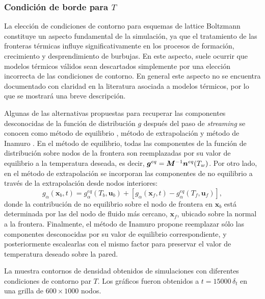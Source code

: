 \subsubsection{Condici\'on de borde para $T$}

La elecci\'on de condiciones de contorno para esquemas de lattice Boltzmann constituye un aspecto fundamental de la simulaci\'on, ya que el tratamiento de las fronteras t\'ermicas influye significativamente en los procesos de formaci\'on, crecimiento y desprendimiento de burbujas. En este aspecto, suele ocurrir que modelos t\'ermicos v\'alidos sean descartados simplemente por una elecci\'on incorrecta de las condiciones de contorno. En general este aspecto no se encuentra documentado con claridad en la literatura asociada a modelos t\'ermicos, por lo que se mostrar\'a una breve descripci\'on.

Algunas de las alternativas propuestas para recuperar las componentes desconocidas de la funci\'on de distribuci\'on $g$ despu\'es del paso de \emph{streaming} se conocen como m\'etodo de equilibrio \cite{kruger_lattice_2017}, m\'etodo de extrapolaci\'on \cite{guo_extrapolation_2002} y m\'etodo de Inamuro \cite{inamuro_lattice_2002}. En el m\'etodo de equilibrio, todas las componentes de la funci\'on de distribuci\'on sobre nodos de la frontera son reemplazadas por su valor de equilibrio a la temperatura deseada, es decir, $\bm{g}^{eq} = \bm{M}^{-1}\bm{n}^{eq}(T_w)$.  Por otro lado, en el m\'etodo de extrapolaci\'on se incorporan las componentes de no equilibrio a trav\'es de la extrapolaci\'on desde nodos interiores:
\begin{equation}
	g_{\alpha}(\bm{x}_b,t) = g_{\alpha}^{eq}(T_b, \bm{u}_b) + \left[ g_{\alpha}(\bm{x}_f,t) - g_{\alpha}^{eq}(T_f, \bm{u}_f)\right],
\end{equation}
donde la contribuci\'on de no equilibrio sobre el nodo de frontera en $\bm{x}_b$ est\'a determinada por las del nodo de fluido m\'as cercano, $\bm{x}_f$, ubicado sobre la normal a la frontera. Finalmente, el m\'etodo de Inamuro propone reemplazar s\'olo las componentes desconocidas por su valor de equilibrio correspondiente, y posteriormente escalearlas con el mismo factor para preservar el valor de temperatura deseado sobre la pared.

La  muestra contornos de densidad obtenidos de simulaciones con diferentes condiciones de contorno par $T$. Los gr\'aficos fueron obtenidos a $t=15000\,\delta_t$ en una grilla de $600\times 1000$ nodos. 

